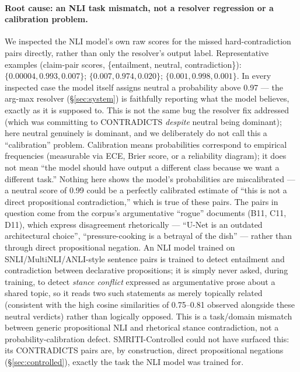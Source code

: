 \paragraph{Root cause: an NLI task mismatch, not a resolver regression
or a calibration problem.} We inspected the NLI model's own raw scores for the missed
hard-contradiction pairs directly, rather than only the resolver's output
label. Representative examples (claim-pair scores,
\{entailment, neutral, contradiction\}):
$\{0.00004, 0.993, 0.007\}$;
$\{0.007, 0.974, 0.020\}$;
$\{0.001, 0.998, 0.001\}$.
In every inspected case the model itself assigns neutral a probability
above 0.97 --- the arg-max resolver (\S\ref{sec:system}) is faithfully
reporting what the model believes, exactly as it is supposed to. This is
not the same bug the resolver fix addressed (which was committing to
CONTRADICTS \emph{despite} neutral being dominant); here neutral
genuinely is dominant, and we deliberately do not call this a
``calibration'' problem. Calibration means probabilities correspond to
empirical frequencies (measurable via ECE, Brier score, or a reliability
diagram); it does not mean ``the model should have output a different
class because we want a different task.'' Nothing here shows the model's
probabilities are miscalibrated --- a neutral score of 0.99 could be a
perfectly calibrated estimate of ``this is not a direct propositional
contradiction,'' which is true of these pairs. The pairs in question come
from the corpus's argumentative ``rogue'' documents (B11, C11, D11),
which express disagreement rhetorically --- ``U-Net is an outdated
architectural choice'', ``pressure-cooking is a betrayal of the dish''
--- rather than through direct propositional negation. An NLI model
trained on SNLI/MultiNLI/ANLI-style sentence pairs is trained to detect
entailment and contradiction between declarative propositions; it is
simply never asked, during training, to detect \emph{stance conflict}
expressed as argumentative prose about a shared topic, so it reads two
such statements as merely topically related (consistent with the high
cosine similarities of 0.75--0.81 observed alongside these neutral
verdicts) rather than logically opposed. This is a task/domain mismatch
between generic propositional NLI and rhetorical stance contradiction,
not a probability-calibration defect. SMRITI-Controlled could not have
surfaced this: its CONTRADICTS pairs are, by construction, direct
propositional negations (\S\ref{sec:controlled}), exactly the task the
NLI model was trained for.


